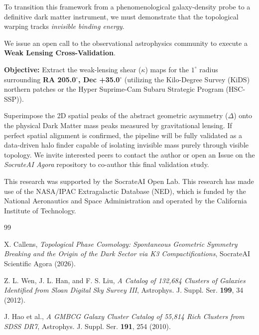 \documentclass[aps,prd,twocolumn,nofootinbib,superscriptaddress,10pt]{revtex4-2}
\begin{document}
To transition this framework from a phenomenological galaxy-density probe to a definitive dark matter instrument, we must demonstrate that the topological warping tracks \textit{invisible binding energy}. 

We issue an open call to the observational astrophysics community to execute a \textbf{Weak Lensing Cross-Validation}.

\textbf{Objective:} Extract the weak-lensing shear ($\kappa$) maps for the $1^\circ$ radius surrounding \textbf{RA 205.0$^\circ$, Dec +35.0$^\circ$} (utilizing the Kilo-Degree Survey (KiDS) northern patches or the Hyper Suprime-Cam Subaru Strategic Program (HSC-SSP)). 

Superimpose the 2D spatial peaks of the abstract geometric asymmetry ($\Delta$) onto the physical Dark Matter mass peaks measured by gravitational lensing. If perfect spatial alignment is confirmed, the pipeline will be fully validated as a data-driven halo finder capable of isolating invisible mass purely through visible topology. We invite interested peers to contact the author or open an Issue on the \textit{SocrateAI Agora} repository to co-author this final validation study.

\begin{acknowledgments}
This research was supported by the SocrateAI Open Lab. This research has made use of the NASA/IPAC Extragalactic Database (NED), which is funded by the National Aeronautics and Space Administration and operated by the California Institute of Technology.
\end{acknowledgments}

\begin{thebibliography}{99}

X. Callens,
\textit{Topological Phase Cosmology: Spontaneous Geometric Symmetry Breaking and the Origin of the Dark Sector via K3 Compactifications},
SocrateAI Scientific Agora (2026).

Z. L. Wen, J. L. Han, and F. S. Liu,
\textit{A Catalog of 132,684 Clusters of Galaxies Identified from Sloan Digital Sky Survey III},
Astrophys. J. Suppl. Ser. \textbf{199}, 34 (2012).

J. Hao et al.,
\textit{A GMBCG Galaxy Cluster Catalog of 55,814 Rich Clusters from SDSS DR7},
Astrophys. J. Suppl. Ser. \textbf{191}, 254 (2010).

\end{thebibliography}
\end{document}
